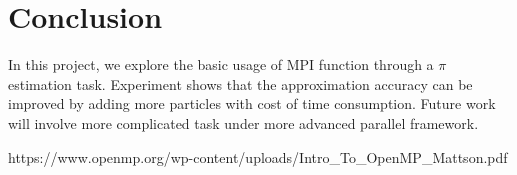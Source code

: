 \documentclass[10pt,twocolumn,letterpaper]{article}
\begin{document}
    \section{Conclusion}
    In this project, we explore the basic usage of MPI function through a $\pi$ estimation
    task. Experiment shows that the approximation accuracy can be improved by adding more 
    particles with cost of time consumption. Future work will involve more complicated 
     task under more advanced parallel framework.

    
    {\small
    
    
    }
    \begin{thebibliography}{1}

    https://www.openmp.org/wp-content/uploads/Intro\_To\_OpenMP\_Mattson.pdf
    \end{thebibliography}

    
\end{document}
